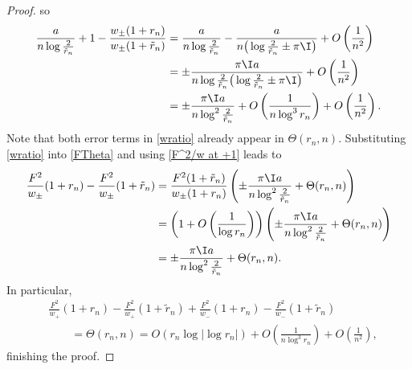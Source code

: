 \begin{proof}
so
\begin{align}\nonumber
 \frac{a}{ n\log \frac{2}{\tilde r_n}} + 1-\frac{w_\pm(1+r_n)}{w_\pm(1+\tilde r_n)} &= \frac{a}{ n\log \frac{2}{\tilde r_n}} - \frac{a}{n\big(\log \frac{2}{\tilde r_n}\pm \pi \I\big)} + O\left(\frac{1}{n^2}\right)
 \\\nonumber
 &= \pm \frac{\pi\I a }{n \log \frac{2}{\tilde r_n}\big(\log \frac{2}{\tilde r_n}\pm \pi \I\big)} + O\left(\frac{1}{n^2}\right)
 \\\label{wratio}
 &= \pm\frac{\pi\I a}{n \log^2\frac{2}{\tilde r_n}} + O\left(\frac{1}{n \log^3 r_n}\right)+ O\left(\frac{1}{n^2}\right).
\end{align}
Note that both error terms in \eqref{wratio} already appear in $\Theta(r_n, n)$. Substituting \eqref{wratio} into \eqref{FTheta} and using \eqref{F^2/w at +1} leads to
\begin{align*}
 \frac{F^2}{w_\pm}(1+r_n) - \frac{F^2}{w_\pm}(1+\tilde r_n) &= \frac{F^2(1+\tilde r_n)}{w_\pm(1+r_n)}\left( \pm \frac{\pi\I a}{n \log^2\frac{2}{\tilde r_n}} + \Theta(r_n, n)\right)
 \\
 &= \left(1+ O\left(\frac{1}{\log r_n}\right)\right)\left(\pm\frac{\pi\I a}{n \log^2\frac{2}{\tilde r_n}} + \Theta(r_n, n)\right)
 \\
 &= \pm\frac{\pi\I a}{n \log^2\frac{2}{\tilde r_n}} + \Theta(r_n, n).
\end{align*}
In particular,
\begin{align*}
 &\frac{F^2}{w_+}(1+r_n)-\frac{F^2}{w_+}(1+\tilde r_n)+\frac{F^2}{w_-}(1+r_n)-\frac{F^2}{w_-}(1+\tilde r_n)
 \\
 &\qquad= \Theta(r_n ,n)= O(r_n \log |\log r_n|) + O\left(\frac{1}{n\log^3 r_n}\right) + O\left(\frac{1}{n^2}\right),
\end{align*}
finishing the proof.
\end{proof}

